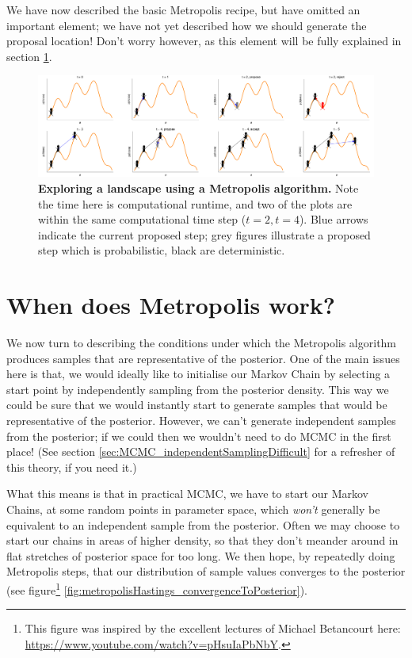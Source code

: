 \documentclass[11pt,fullpage]{book}
\begin{document}
We have now described the basic Metropolis recipe, but have omitted an important element; we have not yet described how we should generate the proposal location! Don't worry however, as this element will be fully explained in section \ref{sec:metropolisHastings_conditionsForMetropolis}.

\begin{figure}
\centerline{\includegraphics[width=1.5\textwidth]{metropolisHastings_walker.pdf}}
\caption{\textbf{Exploring a landscape using a Metropolis algorithm.} Note the time here is computational runtime, and two of the plots are within the same computational time step ($t=2,t=4$). Blue arrows indicate the current proposed step; grey figures illustrate a proposed step which is probabilistic, black are deterministic.}\label{fig:metropolisHastings_walker}
\end{figure}

\section{When does Metropolis work?}\label{sec:metropolisHastings_conditionsForMetropolis}
We now turn to describing the conditions under which the Metropolis algorithm produces samples that are representative of the posterior. One of the main issues here is that, we would ideally like to initialise our Markov Chain by selecting a start point by independently sampling from the posterior density. This way we could be sure that we would instantly start to generate samples that would be representative of the posterior. However, we can't generate independent samples from the posterior; if we could then we wouldn't need to do MCMC in the first place! (See section \ref{sec:MCMC_independentSamplingDifficult} for a refresher of this theory, if you need it.) 

What this means is that in practical MCMC, we have to start our Markov Chains, at some random points in parameter space, which \textit{won't} generally be equivalent to an independent sample from the posterior. Often we may choose to start our chains in areas of higher density, so that they don't meander around in flat stretches of posterior space for too long. We then hope, by repeatedly doing Metropolis steps, that our distribution of sample values converges to the posterior (see figure\footnote{This figure was inspired by the excellent lectures of Michael Betancourt here: \url{https://www.youtube.com/watch?v=pHsuIaPbNbY}.} \ref{fig:metropolisHastings_convergenceToPosterior}).
\end{document}
